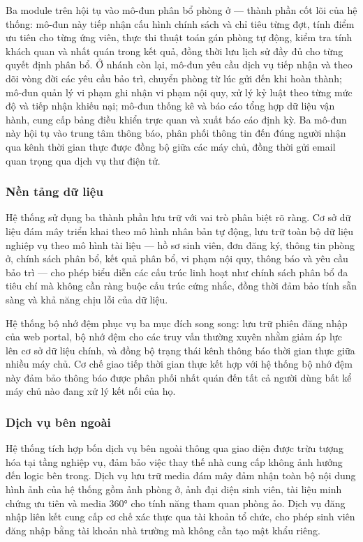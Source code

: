 \documentclass[../DoAn.tex]{subfiles}
\begin{document}
Ba module trên hội tụ vào mô-đun phân bổ phòng ở --- thành phần cốt lõi của hệ
thống: mô-đun này tiếp nhận cấu hình chính sách và chỉ tiêu từng đợt, tính điểm
ưu tiên cho từng ứng viên, thực thi thuật toán gán phòng tự động, kiểm tra tính
khách quan và nhất quán trong kết quả, đồng thời lưu lịch sử đầy đủ cho từng quyết định phân bổ. Ở
nhánh còn lại, mô-đun yêu cầu dịch vụ tiếp nhận và theo dõi vòng đời các yêu
cầu bảo trì, chuyển phòng từ lúc gửi đến khi hoàn thành; mô-đun quản lý vi phạm
ghi nhận vi phạm nội quy, xử lý kỷ luật theo từng mức độ và tiếp nhận khiếu nại;
mô-đun thống kê và báo cáo tổng hợp dữ liệu vận hành, cung cấp bảng điều khiển
trực quan và xuất báo cáo định kỳ. Ba mô-đun này hội tụ vào trung tâm thông báo,
phân phối thông tin đến đúng người nhận qua kênh thời gian thực được đồng bộ
giữa các máy chủ, đồng thời gửi email quan trọng qua dịch vụ thư điện tử.

\subsubsection*{Nền tảng dữ liệu}

Hệ thống sử dụng ba thành phần lưu trữ với vai trò phân biệt rõ ràng. Cơ sở dữ
liệu đám mây triển khai theo mô hình nhân bản tự động, lưu trữ toàn bộ dữ liệu
nghiệp vụ theo mô hình tài liệu --- hồ sơ sinh viên, đơn đăng ký, thông tin
phòng ở, chính sách phân bổ, kết quả phân bổ, vi phạm nội quy, thông báo và
yêu cầu bảo trì --- cho phép biểu diễn các cấu trúc linh hoạt như chính sách
phân bổ đa tiêu chí mà không cần ràng buộc cấu trúc cứng nhắc, đồng thời đảm
bảo tính sẵn sàng và khả năng chịu lỗi của dữ liệu.

Hệ thống bộ nhớ đệm phục vụ ba mục đích song song: lưu trữ phiên đăng nhập của
web portal, bộ nhớ đệm cho các truy vấn thường xuyên nhằm giảm áp lực lên cơ sở
dữ liệu chính, và đồng bộ trạng thái kênh thông báo thời gian thực giữa nhiều
máy chủ. Cơ chế giao tiếp thời gian thực kết hợp với hệ thống bộ nhớ đệm này
đảm bảo thông báo được phân phối nhất quán đến tất cả người dùng bất kể máy chủ
nào đang xử lý kết nối của họ.

\subsubsection*{Dịch vụ bên ngoài}

Hệ thống tích hợp bốn dịch vụ bên ngoài thông qua giao diện được trừu tượng hóa
tại tầng nghiệp vụ, đảm bảo việc thay thế nhà cung cấp không ảnh hưởng đến logic
bên trong. Dịch vụ lưu trữ media đám mây đảm nhận toàn bộ nội dung hình ảnh của
hệ thống gồm ảnh phòng ở, ảnh đại diện sinh viên, tài liệu minh chứng ưu tiên và
media 360° cho tính năng tham quan phòng ảo. Dịch vụ đăng nhập liên kết cung cấp
cơ chế xác thực qua tài khoản tổ chức, cho phép sinh viên đăng nhập bằng tài
khoản nhà trường mà không cần tạo mật khẩu riêng.
\end{document}
